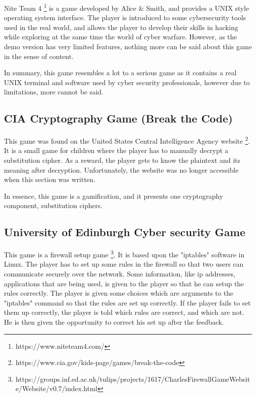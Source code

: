 \documentclass{l4proj}
\begin{document}
Nite Team 4 \footnote{https://www.niteteam4.com/} is a game developed by Alice \& Smith, and provides a UNIX style operating system interface. 
The player is introduced to some cybersecurity tools used in the real world, 
and allows the player to develop their skills in hacking while exploring at the same time the world of cyber warfare.
However, as the demo version has very limited features, nothing more can be said about this game in the sense of content.

In summary, this game resembles a lot to a serious game as it contains a real UNIX terminal and software used by cyber security professionals, 
however due to limitations, more cannot be said.

\subsection{CIA Cryptography Game (Break the Code)}

This game was found on the United States Central Intelligence Agency website \footnote{https://www.cia.gov/kids-page/games/break-the-code}. 
It is a small game for children where the player has to manually decrypt a substitution cipher. 
As a reward, the player gets to know the plaintext and its meaning after decryption.
Unfortunately, the website was no longer accessible when this section was written. 

In essence, this game is a gamification, and it presents one cryptography component, substitution ciphers. 

\subsection{University of Edinburgh Cyber security Game}

This game is a firewall setup game \footnote{https://groups.inf.ed.ac.uk/tulips/projects/1617/CharlesFirewallGameWebsite/Website/v0.7/index.html}. 
It is based upon the "iptables" software in Linux. 
The player has to set up some rules in the firewall so that two users can communicate securely over the network.
Some information, like ip addresses, applications that are being used, is given to the player so that he can setup the rules correctly.
The player is given some choices which are arguments to the "iptables" command so that the rules are set up correctly.
If the player fails to set them up correctly, the player is told which rules are correct, and which are not. 
He is then given the opportunity to correct his set up after the feedback.
\end{document}
